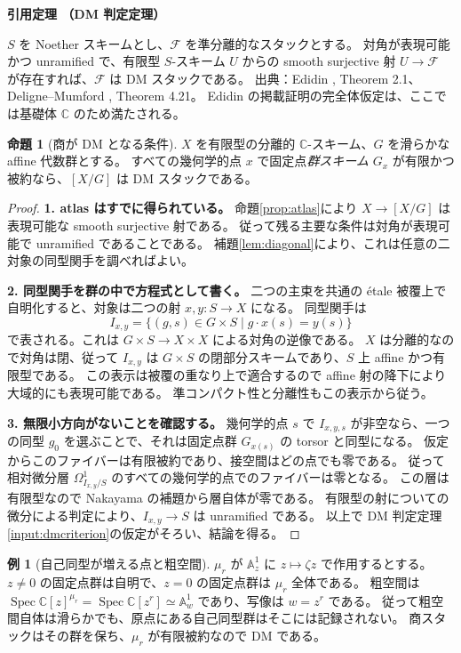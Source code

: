 \documentclass[dvipdfmx,a4paper,11pt]{article}
\theoremstyle{definition}
\newtheorem{prop}[thm]{命題}
\newtheorem{exa}[thm]{例}
\newcommand{\C}{\mathbb C}\newcommand{\R}{\mathbb R}\newcommand{\Z}{\mathbb Z}\newcommand{\Q}{\mathbb Q}
\DeclareMathOperator{\Spec}{Spec}\DeclareMathOperator{\Proj}{Proj}\DeclareMathOperator{\GL}{GL}
\newcommand{\A}{\mathbb A}
\newenvironment{external}[1]{\Needspace{7\baselineskip}\refstepcounter{thm}\begin{tcolorbox}[mybox,colback=blue!2,colframe=blue!40!black]\textbf{引用定理 \thethm（#1）}\par}{\end{tcolorbox}}
\begin{document}
\begin{external}{DM 判定定理}\label{input:dmcriterion}
$S$ を Noether スキームとし、$\mathcal F$ を準分離的なスタックとする。
対角が表現可能かつ unramified で、有限型 $S$-スキーム $U$ からの smooth surjective 射 $U\to\mathcal F$ が存在すれば、$\mathcal F$ は DM スタックである。
出典：Edidin \cite{Edidin}, Theorem 2.1、Deligne--Mumford \cite{DM}, Theorem 4.21。
Edidin の掲載証明の完全体仮定は、ここでは基礎体 $\C$ のため満たされる。
\end{external}
\begin{prop}[商が DM となる条件]\label{prop:quotdm}
$X$ を有限型の分離的 $\C$-スキーム、$G$ を滑らかな affine 代数群とする。
すべての幾何学的点 $x$ で固定点\emph{群スキーム} $G_x$ が有限かつ被約なら、$[X/G]$ は DM スタックである。
\end{prop}
\begin{proof}
\textbf{1. atlas はすでに得られている。}
命題\ref{prop:atlas}により $X\to[X/G]$ は表現可能な smooth surjective 射である。
従って残る主要な条件は対角が表現可能で unramified であることである。
補題\ref{lem:diagonal}により、これは任意の二対象の同型関手を調べればよい。

\textbf{2. 同型関手を群の中で方程式として書く。}
二つの主束を共通の étale 被覆上で自明化すると、対象は二つの射 $x,y:S\to X$ になる。
同型関手は
\[
I_{x,y}=\{(g,s)\in G\times S\mid g\cdot x(s)=y(s)\}
\]
で表される。これは $G\times S\to X\times X$ による対角の逆像である。
$X$ は分離的なので対角は閉、従って $I_{x,y}$ は $G\times S$ の閉部分スキームであり、$S$ 上 affine かつ有限型である。
この表示は被覆の重なり上で適合するので affine 射の降下により大域的にも表現可能である。
準コンパクト性と分離性もこの表示から従う。

\textbf{3. 無限小方向がないことを確認する。}
幾何学的点 $s$ で $I_{x,y,s}$ が非空なら、一つの同型 $g_0$ を選ぶことで、それは固定点群 $G_{x(s)}$ の torsor と同型になる。
仮定からこのファイバーは有限被約であり、接空間はどの点でも零である。
従って相対微分層 $\Omega^1_{I_{x,y}/S}$ のすべての幾何学的点でのファイバーは零となる。
この層は有限型なので Nakayama の補題から層自体が零である。
有限型の射についての微分による判定により、$I_{x,y}\to S$ は unramified である。
以上で DM 判定定理\ref{input:dmcriterion}の仮定がそろい、結論を得る。
\end{proof}
\begin{exa}[自己同型が増える点と粗空間]
$\mu_r$ が $\A^1_z$ に $z\mapsto\zeta z$ で作用するとする。
$z\neq0$ の固定点群は自明で、$z=0$ の固定点群は $\mu_r$ 全体である。
粗空間は $\Spec\C[z]^{\mu_r}=\Spec\C[z^r]\simeq\A^1_w$ であり、写像は $w=z^r$ である。
従って粗空間自体は滑らかでも、原点にある自己同型群はそこには記録されない。
商スタックはその群を保ち、$\mu_r$ が有限被約なので DM である。
\end{exa}
\end{document}
